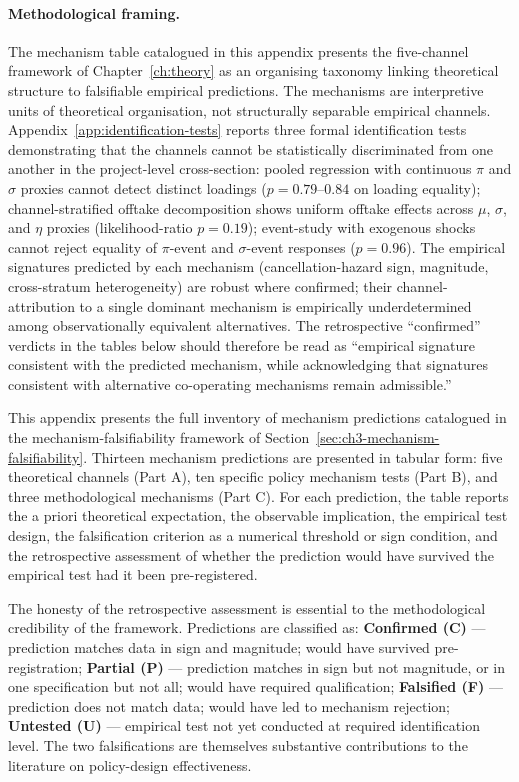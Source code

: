 \paragraph{Methodological framing.} The mechanism table catalogued in this appendix presents the five-channel framework of Chapter~\ref{ch:theory} as an organising taxonomy linking theoretical structure to falsifiable empirical predictions. The mechanisms are interpretive units of theoretical organisation, not structurally separable empirical channels. Appendix~\ref{app:identification-tests} reports three formal identification tests demonstrating that the channels cannot be statistically discriminated from one another in the project-level cross-section: pooled regression with continuous $\pi$ and $\sigma$ proxies cannot detect distinct loadings ($p = 0.79$--$0.84$ on loading equality); channel-stratified offtake decomposition shows uniform offtake effects across $\mu$, $\sigma$, and $\eta$ proxies (likelihood-ratio $p = 0.19$); event-study with exogenous shocks cannot reject equality of $\pi$-event and $\sigma$-event responses ($p = 0.96$). The empirical signatures predicted by each mechanism (cancellation-hazard sign, magnitude, cross-stratum heterogeneity) are robust where confirmed; their channel-attribution to a single dominant mechanism is empirically underdetermined among observationally equivalent alternatives. The retrospective ``confirmed'' verdicts in the tables below should therefore be read as ``empirical signature consistent with the predicted mechanism, while acknowledging that signatures consistent with alternative co-operating mechanisms remain admissible.''



This appendix presents the full inventory of mechanism predictions catalogued in the mechanism-falsifiability framework of Section~\ref{sec:ch3-mechanism-falsifiability}. Thirteen mechanism predictions are presented in tabular form: five theoretical channels (Part A), ten specific policy mechanism tests (Part B), and three methodological mechanisms (Part C). For each prediction, the table reports the a priori theoretical expectation, the observable implication, the empirical test design, the falsification criterion as a numerical threshold or sign condition, and the retrospective assessment of whether the prediction would have survived the empirical test had it been pre-registered.

The honesty of the retrospective assessment is essential to the methodological credibility of the framework. Predictions are classified as: \textbf{Confirmed (C)} --- prediction matches data in sign and magnitude; would have survived pre-registration; \textbf{Partial (P)} --- prediction matches in sign but not magnitude, or in one specification but not all; would have required qualification; \textbf{Falsified (F)} --- prediction does not match data; would have led to mechanism rejection; \textbf{Untested (U)} --- empirical test not yet conducted at required identification level. The two falsifications are themselves substantive contributions to the literature on policy-design effectiveness.


